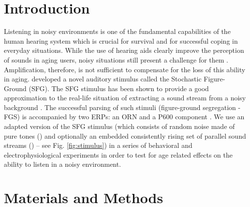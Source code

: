 \documentclass[a0,portrait]{a0poster}
\begin{document}
\vspace{0cm} %


\begin{multicols}{2} %


\color{DarkSlateGray} %

\section*{Introduction}
\large
Listening in noisy environments is one of the fundamental capabilities of the human hearing system which is crucial for survival and for successful coping in everyday situations. While the use of hearing aids clearly improve the perception of sounds in aging users, noisy situations still present a challenge for them \autocite{Wu2013}. Amplification, therefore, is not sufficient to compensate for the loss of this ability in aging. \textcite{Teki2011} developed a novel auditory stimulus called the Stochastic Figure-Ground (SFG). The SFG stimulus has been shown to provide a good approximation to the real-life situation of extracting a sound stream from a noisy background \autocite{Dykstra2017, Teki2013}. The successful parsing of such stimuli (figure-ground segregation - FGS) is accompanied by two ERPs: an ORN and a P600 component \autocite{Dykstra2017, Toth2016}. We use an adapted version of the SFG stimulus \autocite{OSullivan2015} (which consists of random noise made of pure tones () and optionally an embedded consistently rising set of parallel sound streams () -- see Fig. \ref{fig:stimulus}) in a series of behavioral and electrophysiological experiments in order to test for age related effects on the ability to listen in a noisy environment.

\section*{Materials and Methods}


\end{multicols}
\end{document}
